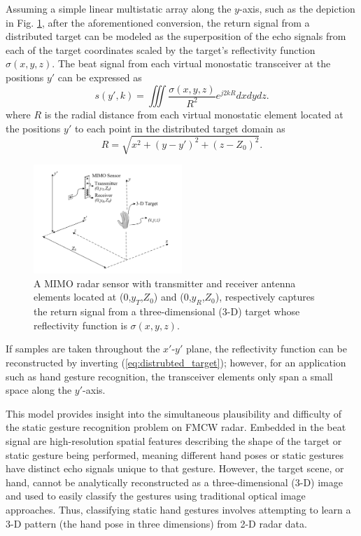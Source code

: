 \documentclass{ieeeaccess}
\begin{document}
Assuming a simple linear multistatic array along the $y$-axis, such as the depiction in Fig. \ref{fig:hand_scenario}, after the aforementioned conversion, the return signal from a distributed target can be modeled as the superposition of the echo signals from each of the target coordinates scaled by the target's reflectivity function $\sigma(x,y,z)$. The beat signal from each virtual monostatic transceiver at the positions $y'$ can be expressed as
\begin{equation}
\label{eq:distrubted_target}
    s(y',k) = \iiint \frac{\sigma(x,y,z)}{R^2}e^{j2kR}dxdydz.
\end{equation}
where $R$ is the radial distance from each virtual monostatic element located at the positions $y'$ to each point in the distributed target domain as 
\begin{equation}
    R = \sqrt{x^2 + (y-y')^2 + (z-Z_0)^2}.
\end{equation}

\begin{figure}[h]
    \centering
    \includegraphics[width=0.5\textwidth]{MIMO_hand_gesture_scenario.png}
    \caption{A MIMO radar sensor with transmitter and receiver antenna elements located at ($0$,$y_T$,$Z_0$) and ($0$,$y_R$,$Z_0$), respectively captures the return signal from a three-dimensional (3-D) target whose reflectivity function is $\sigma(x,y,z)$.}
    \label{fig:hand_scenario}
\end{figure}

If samples are taken throughout the $x'$-$y'$ plane, the reflectivity function can be reconstructed by inverting (\ref{eq:distrubted_target}); however, for an application such as hand gesture recognition, the transceiver elements only span a small space along the $y'$-axis. 

This model provides insight into the simultaneous plausibility and difficulty of the static gesture recognition problem on FMCW radar. Embedded in the beat signal are high-resolution spatial features describing the shape of the target or static gesture being performed, meaning different hand poses or static gestures have distinct echo signals unique to that gesture. However, the target scene, or hand, cannot be analytically reconstructed as a three-dimensional (3-D) image and used to easily classify the gestures using traditional optical image approaches. Thus, classifying static hand gestures involves attempting to learn a 3-D pattern (the hand pose in three dimensions) from 2-D radar data. 
\end{document}
